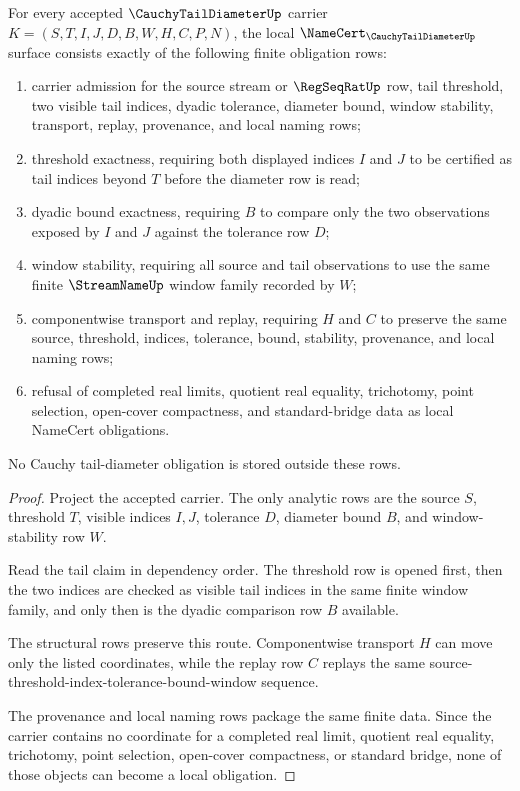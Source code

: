 \begin{theorem}
\label{thm:cauchy-tail-diameter-namecert-obligations}
For every accepted $\CauchyTailDiameterUp$ carrier $K=(S,T,I,J,D,B,W,H,C,P,N)$, the local $\NameCert_{\CauchyTailDiameterUp}$ surface consists exactly of the following finite obligation rows:
\begin{enumerate}
\item carrier admission for the source stream or $\RegSeqRatUp$ row, tail threshold, two visible tail indices, dyadic tolerance, diameter bound, window stability, transport, replay, provenance, and local naming rows;
\item threshold exactness, requiring both displayed indices $I$ and $J$ to be certified as tail indices beyond $T$ before the diameter row is read;
\item dyadic bound exactness, requiring $B$ to compare only the two observations exposed by $I$ and $J$ against the tolerance row $D$;
\item window stability, requiring all source and tail observations to use the same finite $\StreamNameUp$ window family recorded by $W$;
\item componentwise transport and replay, requiring $H$ and $C$ to preserve the same source, threshold, indices, tolerance, bound, stability, provenance, and local naming rows;
\item refusal of completed real limits, quotient real equality, trichotomy, point selection, open-cover compactness, and standard-bridge data as local NameCert obligations.
\end{enumerate}
No Cauchy tail-diameter obligation is stored outside these rows.
\end{theorem}
\begin{proof}
Project the accepted carrier. The only analytic rows are the source $S$, threshold $T$, visible indices $I,J$, tolerance $D$, diameter bound $B$, and window-stability row $W$.

Read the tail claim in dependency order. The threshold row is opened first, then the two indices are checked as visible tail indices in the same finite window family, and only then is the dyadic comparison row $B$ available.

The structural rows preserve this route. Componentwise transport $H$ can move only the listed coordinates, while the replay row $C$ replays the same source-threshold-index-tolerance-bound-window sequence.

The provenance and local naming rows package the same finite data. Since the carrier contains no coordinate for a completed real limit, quotient real equality, trichotomy, point selection, open-cover compactness, or standard bridge, none of those objects can become a local obligation.
\end{proof}

